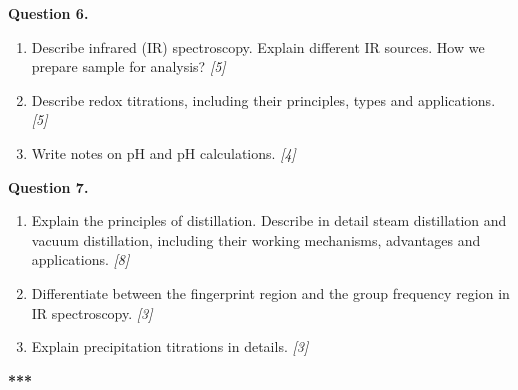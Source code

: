 \documentclass[11pt,a4paper]{article}
\newcommand{\pts}[1]{\hfill \textit{[#1]}}
\begin{document}
\bigskip

\noindent \textbf{Question 6.}
\begin{enumerate}[label=(\alph*)]
  \item Describe infrared (IR) spectroscopy. Explain different IR sources. How we prepare sample for analysis? \pts{5}
  \item Describe redox titrations, including their principles, types and applications. \pts{5}
  \item Write notes on pH and pH calculations. \pts{4}
\end{enumerate}

\bigskip

\noindent \textbf{Question 7.}
\begin{enumerate}[label=(\alph*)]
  \item Explain the principles of distillation. Describe in detail steam distillation and vacuum distillation, including their working mechanisms, advantages and applications. \pts{8}
  \item Differentiate between the fingerprint region and the group frequency region in IR spectroscopy. \pts{3}
  \item Explain precipitation titrations in details. \pts{3}
\end{enumerate}

\bigskip
\begin{center}
  \textbf{***}
\end{center}
\end{document}
